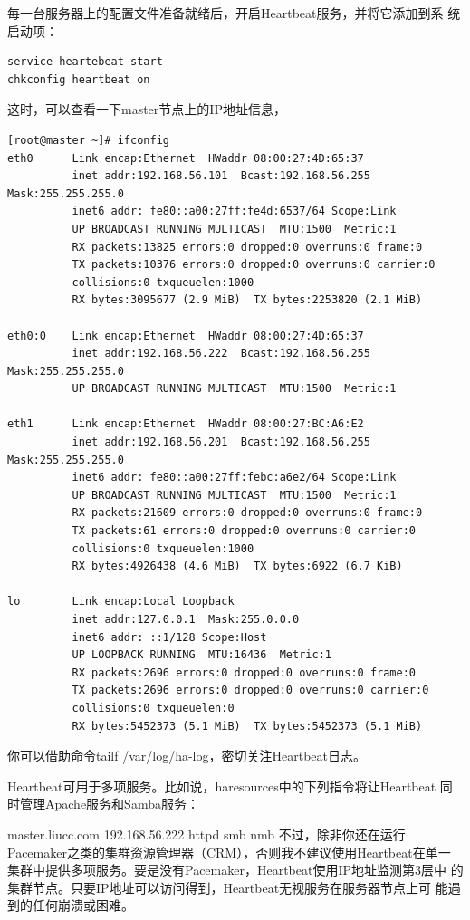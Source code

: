 每一台服务器上的配置文件准备就绪后，开启Heartbeat服务，并将它添加到系
统启动项：

\begin{verbatim}
service heartebeat start
chkconfig heartbeat on
\end{verbatim}

这时，可以查看一下master节点上的IP地址信息，

\begin{verbatim}
[root@master ~]# ifconfig 
eth0      Link encap:Ethernet  HWaddr 08:00:27:4D:65:37  
          inet addr:192.168.56.101  Bcast:192.168.56.255  Mask:255.255.255.0
          inet6 addr: fe80::a00:27ff:fe4d:6537/64 Scope:Link
          UP BROADCAST RUNNING MULTICAST  MTU:1500  Metric:1
          RX packets:13825 errors:0 dropped:0 overruns:0 frame:0
          TX packets:10376 errors:0 dropped:0 overruns:0 carrier:0
          collisions:0 txqueuelen:1000 
          RX bytes:3095677 (2.9 MiB)  TX bytes:2253820 (2.1 MiB)

eth0:0    Link encap:Ethernet  HWaddr 08:00:27:4D:65:37  
          inet addr:192.168.56.222  Bcast:192.168.56.255  Mask:255.255.255.0
          UP BROADCAST RUNNING MULTICAST  MTU:1500  Metric:1

eth1      Link encap:Ethernet  HWaddr 08:00:27:BC:A6:E2  
          inet addr:192.168.56.201  Bcast:192.168.56.255  Mask:255.255.255.0
          inet6 addr: fe80::a00:27ff:febc:a6e2/64 Scope:Link
          UP BROADCAST RUNNING MULTICAST  MTU:1500  Metric:1
          RX packets:21609 errors:0 dropped:0 overruns:0 frame:0
          TX packets:61 errors:0 dropped:0 overruns:0 carrier:0
          collisions:0 txqueuelen:1000 
          RX bytes:4926438 (4.6 MiB)  TX bytes:6922 (6.7 KiB)

lo        Link encap:Local Loopback  
          inet addr:127.0.0.1  Mask:255.0.0.0
          inet6 addr: ::1/128 Scope:Host
          UP LOOPBACK RUNNING  MTU:16436  Metric:1
          RX packets:2696 errors:0 dropped:0 overruns:0 frame:0
          TX packets:2696 errors:0 dropped:0 overruns:0 carrier:0
          collisions:0 txqueuelen:0 
          RX bytes:5452373 (5.1 MiB)  TX bytes:5452373 (5.1 MiB)
\end{verbatim}

你可以借助命令tailf /var/log/ha-log，密切关注Heartbeat日志。

Heartbeat可用于多项服务。比如说，haresources中的下列指令将让Heartbeat
同时管理Apache服务和Samba服务：

master.liucc.com 192.168.56.222 httpd smb nmb 不过，除非你还在运行
Pacemaker之类的集群资源管理器（CRM），否则我不建议使用Heartbeat在单一
集群中提供多项服务。要是没有Pacemaker，Heartbeat使用IP地址监测第3层中
的集群节点。只要IP地址可以访问得到，Heartbeat无视服务在服务器节点上可
能遇到的任何崩溃或困难。

